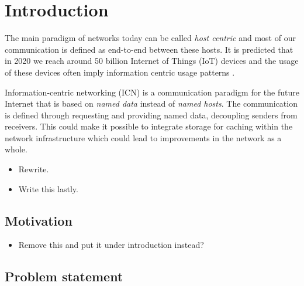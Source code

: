 \section{Introduction}
The main paradigm of networks today can be called  \textit{host centric} and most of our communication is defined as end-to-end between these hosts. It is predicted that in 2020 we reach around 50 billion Internet of Things (IoT) devices \cite{alanCarlton} and the usage of these devices often imply information centric usage patterns \cite{Ahlgren2012}. 

Information-centric networking (ICN) is a communication paradigm for the future Internet that is based on \textit{named data} instead of \textit{named hosts}. The communication is defined through requesting and providing named data, decoupling senders from receivers. This could make it possible to integrate storage for caching within the network infrastructure \cite{Ahlgren2012} which could lead to improvements in the network as a whole.

\begin{itemize}
	\item Rewrite.
	\item Write this lastly.
\end{itemize}



\subsection{Motivation}
\begin{itemize}
	\item Remove this and put it under introduction instead?
\end{itemize}

\subsection{Problem statement}

